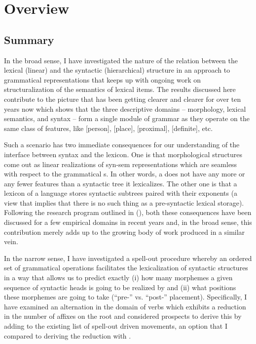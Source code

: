 \chapter{Overview}\label{chapter:conclusion}

\section{Summary}

In the broad sense, I have investigated the nature of the relation between the lexical (linear) and the syntactic (hierarchical) structure in an approach to grammatical representations that keeps up with ongoing work on structuralization of the semantics of lexical items. The results discussed here contribute to the picture that has been getting clearer and clearer for over ten years now which shows that the three descriptive domains -- morphology, lexical semantics, and syntax -- form a single module of grammar as they operate on the same class of features, like [person], [place], [proximal], [definite], etc.
\par
Such a scenario has two immediate consequences for our understanding of the interface between syntax and the lexicon.  One is that morphological structures come out as linear realizations of syn-sem representations  which are seamless with respect to the grammatical s. In other words, a  does not have any more or any fewer features than a syntactic tree it lexicalizes.  The other one is that a lexicon of a language stores syntactic subtrees paired with their exponents (a view that implies that there is no such thing as a pre-syntactic lexical storage). Following the research program outlined in \citeauthor{Starke2009} (\citeyear{Starke2009,StarkeLA}), both these consequences have been discussed for a few empirical domains in recent years and, in the broad sense, this contribution merely adds up to the growing body of work produced in a similar vein. 
\par
In the narrow sense, I have investigated a spell-out procedure whereby an ordered set of grammatical operations facilitates the  lexicalization of syntactic structures in a way that allows us to predict exactly (i) how many morphemes a given sequence of syntactic heads is going to be realized by and (ii) what positions these morphemes are going to take (``pre-'' vs. ``post-'' placement). Specifically, I have examined an  alternation in the domain of  verbs which exhibits a  reduction in the number of affixes on the root and considered prospects to derive this  by adding  to the existing list of spell-out driven movements, an option that I compared to deriving the reduction with .
